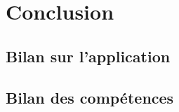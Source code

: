 \section{Conclusion}

\subsection{Bilan sur l'application}

\subsection{Bilan des compétences}


\newpage